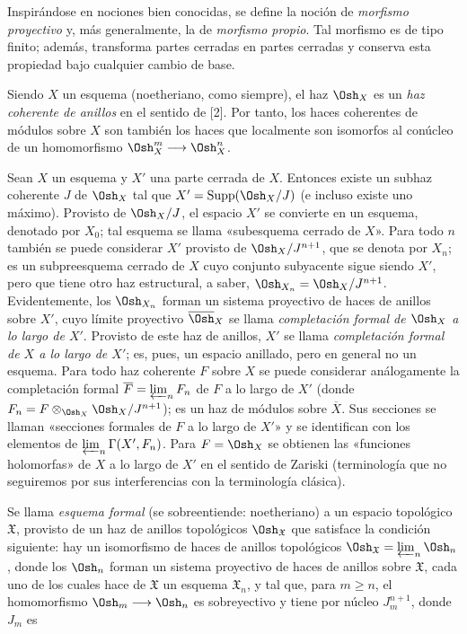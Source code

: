 Inspirándose en nociones bien conocidas, se define la noción de
\emph{morfismo proyectivo} y, más generalmente, la de \emph{morfismo propio}.
Tal morfismo es de tipo finito; además, transforma partes cerradas en partes
cerradas y conserva esta propiedad bajo cualquier cambio de base.

Siendo $X$ un esquema (noetheriano, como siempre), el haz $\Osh_X$ es un
\emph{haz coherente de anillos} en el sentido de [2]. Por tanto, los haces
coherentes de módulos sobre $X$ son también los haces que localmente son
isomorfos al conúcleo de un homomorfismo
$\Osh_X^{m}\longrightarrow\Osh_X^{n}$.


Sean $X$ un esquema y $X'$ una parte cerrada de $X$. Entonces existe un
subhaz coherente $J$ de $\Osh_X$ tal que
$X'=\operatorname{Supp}(\Osh_X/J)$ (e incluso existe uno máximo). Provisto de
$\Osh_X/J$, el espacio $X'$ se convierte en un esquema, denotado por $X_0$;
tal esquema se llama «subesquema cerrado de $X$». Para todo $n$ también se
puede considerar $X'$ provisto de $\Osh_X/J^{n+1}$, que se denota por $X_n$;
es un subpreesquema cerrado de $X$ cuyo conjunto subyacente sigue siendo $X'$,
pero que tiene otro haz estructural, a saber,
$\Osh_{X_n}=\Osh_X/J^{n+1}$. Evidentemente, los $\Osh_{X_n}$ forman un sistema
proyectivo de haces de anillos sobre $X'$, cuyo límite proyectivo
$\overline{\Osh}_X$ se llama \emph{completación formal de $\Osh_X$ a lo largo
de $X'$}. Provisto de este haz de anillos, $X'$ se llama \emph{completación
formal de $X$ a lo largo de $X'$}; es, pues, un espacio anillado, pero en
general no un esquema. Para todo haz coherente $F$ sobre $X$ se puede considerar
análogamente la completación formal $\overline F=\varprojlim_n F_n$ de $F$ a lo
largo de $X'$ (donde $F_n=F\otimes_{\Osh_X}\Osh_X/J^{n+1}$); es un haz de
módulos sobre $\overline X$. Sus secciones se llaman «secciones formales de $F$
a lo largo de $X'$» y se identifican con los elementos de
$\varprojlim_n\Gamma(X',F_n)$. Para $F=\Osh_X$ se obtienen las «funciones
holomorfas» de $X$ a lo largo de $X'$ en el sentido de Zariski (terminología que
no seguiremos por sus interferencias con la terminología clásica).

Se llama \emph{esquema formal} (se sobreentiende: noetheriano) a un espacio
topológico $\mathfrak X$, provisto de un haz de anillos topológicos
$\Osh_{\mathfrak X}$ que satisface la condición siguiente: hay un isomorfismo
de haces de anillos topológicos
$\Osh_{\mathfrak X}=\varprojlim_n\Osh_n$, donde los $\Osh_n$ forman un sistema
proyectivo de haces de anillos sobre $\mathfrak X$, cada uno de los cuales hace
de $\mathfrak X$ un esquema $\mathfrak X_n$, y tal que, para $m\geq n$, el
homomorfismo $\Osh_m\longrightarrow\Osh_n$ es sobreyectivo y tiene por núcleo
$J_m^{n+1}$, donde $J_m$ es

